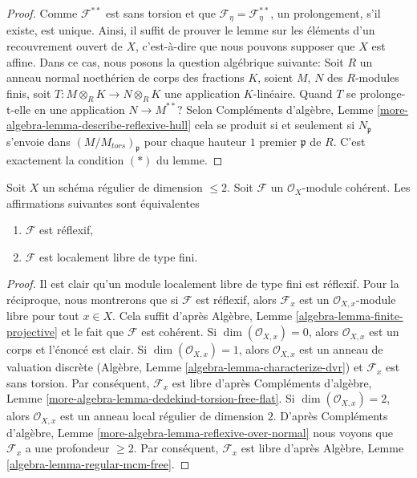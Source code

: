 \begin{proof}
Comme  $\mathcal{F}^{**}$  est sans torsion et que  $\mathcal{F}_\eta = \mathcal{F}^{**}_\eta$, un prolongement, s'il
existe, est unique. Ainsi, il suffit de prouver le lemme sur les éléments d'un
recouvrement ouvert de  $X$, c'est-à-dire que nous pouvons supposer que
 $X$  est affine. Dans ce cas, nous posons la question algébrique suivante:
Soit  $R$  un anneau normal noethérien de corps des fractions  $K$,
soient  $M$,  $N$  des  $R$-modules finis, soit
 $T : M \otimes_R K \to N \otimes_R K$  une application  $K$-linéaire. Quand  $T$  se
prolonge-t-elle en une application  $N \to M^{**}$? Selon Compléments d'algèbre, Lemme
\ref{more-algebra-lemma-describe-reflexive-hull}  cela se produit si et seulement si  $N_\mathfrak p$  s'envoie dans
 $(M/M_{tors})_\mathfrak p$  pour chaque hauteur  $1$  premier  $\mathfrak p$  de
 $R$. C'est exactement la condition  $(*)$  du lemme.
\end{proof}

\begin{lemma}
\label{lemma-reflexive-over-regular-dim-2}
Soit  $X$  un schéma régulier de dimension  $\leq 2$. Soit  $\mathcal{F}$ 
un  $\mathcal{O}_X$-module cohérent. Les affirmations suivantes sont équivalentes
\begin{enumerate}
\item $\mathcal{F}$  est réflexif,
\item $\mathcal{F}$  est localement libre de type fini.
\end{enumerate}
\end{lemma}

\begin{proof}
Il est clair qu'un module localement libre de type fini est réflexif. Pour la réciproque,
nous montrerons que si  $\mathcal{F}$  est réflexif, alors  $\mathcal{F}_x$  est un
 $\mathcal{O}_{X, x}$-module libre pour tout  $x \in X$. Cela suffit d'après Algèbre,
Lemme  \ref{algebra-lemma-finite-projective}  et le fait que  $\mathcal{F}$  est cohérent. Si  $\dim(\mathcal{O}_{X, x}) = 0$,
alors  $\mathcal{O}_{X, x}$  est un corps et l'énoncé est clair. Si  $\dim(\mathcal{O}_{X, x}) = 1$, alors
 $\mathcal{O}_{X, x}$  est un anneau de valuation discrète (Algèbre, Lemme  \ref{algebra-lemma-characterize-dvr}) et
 $\mathcal{F}_x$  est sans torsion. Par conséquent,  $\mathcal{F}_x$  est libre d'après
 Compléments d'algèbre, Lemme  \ref{more-algebra-lemma-dedekind-torsion-free-flat}. Si  $\dim(\mathcal{O}_{X, x}) = 2$, alors  $\mathcal{O}_{X, x}$  est un
 anneau local régulier de dimension  $2$. D'après Compléments d'algèbre, Lemme
 \ref{more-algebra-lemma-reflexive-over-normal}  nous voyons que  $\mathcal{F}_x$  a une profondeur  $\geq 2$. Par
conséquent,  $\mathcal{F}_x$  est libre d'après Algèbre, Lemme  \ref{algebra-lemma-regular-mcm-free}.
\end{proof}







